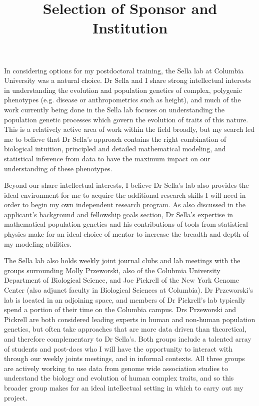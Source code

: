 \documentclass[11pt]{article}
\title{Selection of Sponsor and Institution}
\date{}
\begin{document}
\maketitle

In considering options for my postdoctoral training, the Sella lab at Columbia University was a natural choice. Dr Sella and I share strong intellectual interests in understanding the evolution and population genetics of complex, polygenic phenotypes (e.g. disease or anthropometrics such as height), and  much of the work currently being done in the Sella lab focuses on understanding the population genetic processes which govern the evolution of traits of this nature. This is a relatively active area of work within the field broadly, but my search led me to believe that Dr Sella's approach contains the right combination of biological intuition, principled and detailed mathematical modeling, and statistical inference from data to have the maximum impact on our understanding of these phenotypes. 

Beyond our share intellectual interests, I believe Dr Sella's lab also provides the ideal environment for me to acquire the additional research skills I will need in order to begin my own independent research program. As also discussed in the applicant's background and fellowship goals section, Dr Sella's expertise in mathematical population genetics and his contributions of tools from statistical physics make for an ideal choice of mentor to increase the breadth and depth of my modeling abilities.

The Sella lab also holds weekly joint journal clubs and lab meetings with the groups surrounding Molly Przeworski, also of the Colubmia University Department of Biological Science, and Joe Pickrell of the New York Genome Center (also adjunct faculty in Biological Sciences at Columbia). Dr Przeworski's lab is located in an adjoining space, and members of Dr Pickrell's lab typically spend a portion of their time on the Columbia campus. Drs Przeworski and Pickrell are both considered leading experts in human and non-human population genetics, but often take approaches that are more data driven than theoretical, and therefore complementary to Dr Sella's. Both groups include a talented array of students and post-docs who I will have the opportunity to interact with through our weekly joints meetings, and in informal contexts. All three groups are actively working to use data from genome wide association studies to understand the biology and evolution of human complex traits, and so this broader group makes for an ideal intellectual setting in which to carry out my project.
\end{document}
